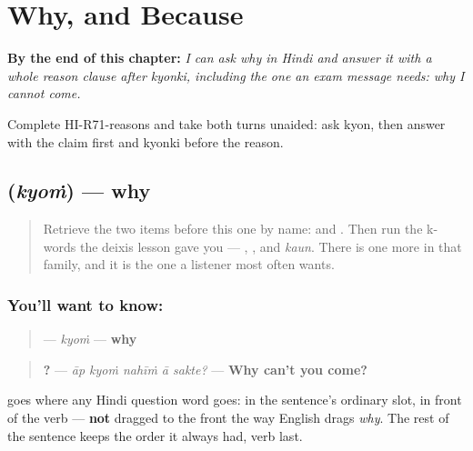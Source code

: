 
\chapter{Why, and Because}
\label{ch:hi-why-because}

\begin{chapteropening}
\textbf{By the end of this chapter:} \emph{I can ask why in Hindi and answer it with a whole reason clause after kyonki, including the one an exam message needs: why I cannot come.}

Complete HI-R71-reasons and take both turns unaided: ask kyon, then answer with the claim first and kyonki before the reason.
\end{chapteropening}

\section[\texorpdfstring{\hi{क्यों} (kyoṁ)}{क्यों (kyoṁ)}]{ (\emph{kyoṁ}) — why}

\label{lesson:HI-C71-kyon}



\begin{quote}
Retrieve the two items before this one by name: \textbf{} and \textbf{}. Then run the k- words the deixis lesson gave you — \textbf{}, \textbf{}, and \emph{kaun}. There is one more in that family, and it is the one a listener most often wants.
\end{quote}

\subsection*{You'll want to know: }
\begin{quote}
\textbf{} — \emph{kyoṁ} — \textbf{why}
\end{quote}

\begin{quote}
\textbf{    ?} — \emph{āp kyoṁ nahīṁ ā sakte?} — \textbf{Why can't you come?}
\end{quote}

\textbf{} goes where any Hindi question word goes: in the sentence's ordinary slot, in front of the verb — \textbf{not} dragged to the front the way English drags \emph{why}. The rest of the sentence keeps the order it always had, verb last.

